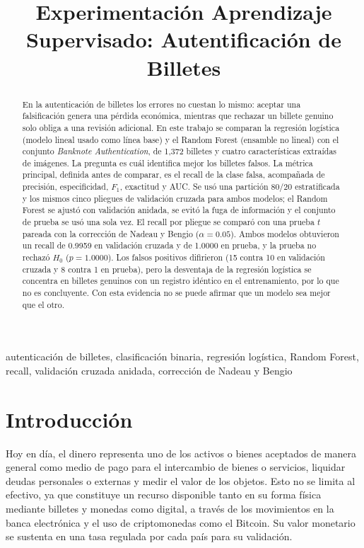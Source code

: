 \documentclass[conference]{IEEEtran}
\title{Experimentación Aprendizaje Supervisado: Autentificación de Billetes }
\author{
	\IEEEauthorblockN{Leonardo Daniel Aviña Neri}
	\IEEEauthorblockA{
		\texttt{ld.avinaneri@ugto.mx}
	}
	\and
	\IEEEauthorblockN{Diana Laura Garcia Zavala}
	\IEEEauthorblockA{
		\texttt{dl.garcia.zavala@ugto.mx}
	}
	\and
	\IEEEauthorblockN{Jonathan Omar Villafaña Razo}
	\IEEEauthorblockA{
		\texttt{jo.villafanarazo@ugto.mx}
	}
	\and
	\IEEEauthorblockN{Alejandro Reynoso Flores}
	\IEEEauthorblockA{
		\texttt{a.reynosoflores@ugto.mx}
	}
	\and
	\IEEEauthorblockN{Ademar Antonio De Leon Vazquez}
	\IEEEauthorblockA{
	\texttt{aa.deleonvazquez@ugto.mx
	}
	}
	\and
	\IEEEauthorblockN{Emmanuel Vargas Cisneros}
	\IEEEauthorblockA{
		\texttt{e.vargascisneros@ugto.mx}
	}
}
\begin{document}
	\maketitle
	
	\begin{abstract}
		En la autenticación de billetes los errores no cuestan lo mismo: aceptar una falsificación genera una pérdida económica, mientras que rechazar un billete genuino solo obliga a una revisión adicional. En este trabajo se comparan la regresión logística (modelo lineal usado como línea base) y el Random Forest (ensamble no lineal) con el conjunto \textit{Banknote Authentication}, de 1,372 billetes y cuatro características extraídas de imágenes. La pregunta es cuál identifica mejor los billetes falsos. La métrica principal, definida antes de comparar, es el recall de la clase falsa, acompañada de precisión, especificidad, $F_1$, exactitud y AUC. Se usó una partición 80/20 estratificada y los mismos cinco pliegues de validación cruzada para ambos modelos; el Random Forest se ajustó con validación anidada, se evitó la fuga de información y el conjunto de prueba se usó una sola vez. El recall por pliegue se comparó con una prueba $t$ pareada con la corrección de Nadeau y Bengio ($\alpha=0.05$). Ambos modelos obtuvieron un recall de 0.9959 en validación cruzada y de 1.0000 en prueba, y la prueba no rechazó $H_0$ ($p=1.0000$). Los falsos positivos difirieron (15 contra 10 en validación cruzada y 8 contra 1 en prueba), pero la desventaja de la regresión logística se concentra en billetes genuinos con un registro idéntico en el entrenamiento, por lo que no es concluyente. Con esta evidencia no se puede afirmar que un modelo sea mejor que el otro.
	\end{abstract}
	
	\begin{IEEEkeywords}
		autenticación de billetes, clasificación binaria, regresión logística, Random Forest, recall, validación cruzada anidada, corrección de Nadeau y Bengio
	\end{IEEEkeywords}
	
	\section{Introducción}
	Hoy en día, el dinero representa uno de los activos o bienes aceptados de manera general como medio de pago para el intercambio de bienes o servicios, liquidar deudas personales o externas y medir el valor de los objetos. Esto no se limita al efectivo, ya que constituye un recurso disponible tanto en su forma física mediante billetes y monedas como digital, a través de los movimientos en la banca electrónica y el uso de criptomonedas como el Bitcoin. Su valor monetario se sustenta en una tasa regulada por cada país para su validación. 
	
\end{document}
